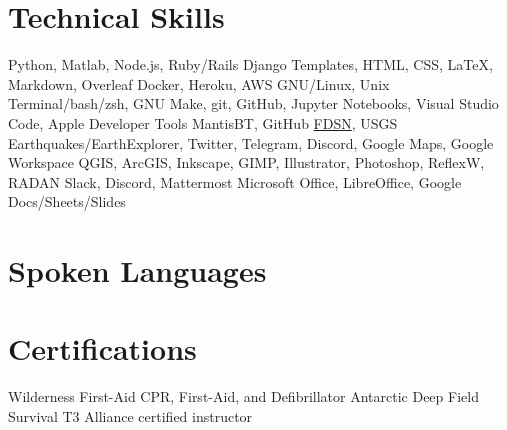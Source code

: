 \documentclass[a4paper,12pt,sans,colorlinks]{moderncv}
\newcommand{\fdsn}{\href{https://www.fdsn.org/services/}{FDSN}}
\begin{document}


\section{Technical Skills}

{
    Python, Matlab, Node.js, Ruby/Rails
}
{
    Django Templates, HTML, CSS, \LaTeX, Markdown, Overleaf
}
{
    Docker, Heroku, AWS
}
{
    GNU/Linux, Unix Terminal/bash/zsh, GNU Make, git, GitHub, Jupyter
    Notebooks, Visual Studio Code, Apple Developer Tools
}
{
    MantisBT, GitHub
}
{
    \fdsn, USGS Earthquakes/EarthExplorer, Twitter, Telegram, Discord, Google
    Maps, Google Workspace
}
{
    QGIS, ArcGIS, Inkscape, GIMP, Illustrator, Photoshop, ReflexW, RADAN
}
{
    Slack, Discord, Mattermost
}
{
    Microsoft Office, LibreOffice, Google Docs/Sheets/Slides
}

\section{Spoken Languages}


\section{Certifications}

{
    Wilderness First-Aid
}
{
    CPR, First-Aid, and Defibrillator
}
{
    Antarctic Deep Field Survival
}
{
    T3 Alliance certified instructor
}
\end{document}
